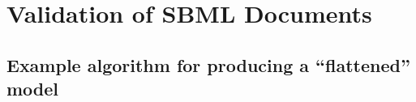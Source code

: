 \section{Validation of SBML Documents}
\label{validation}

\subsection{Example algorithm for producing a ``flattened'' model}